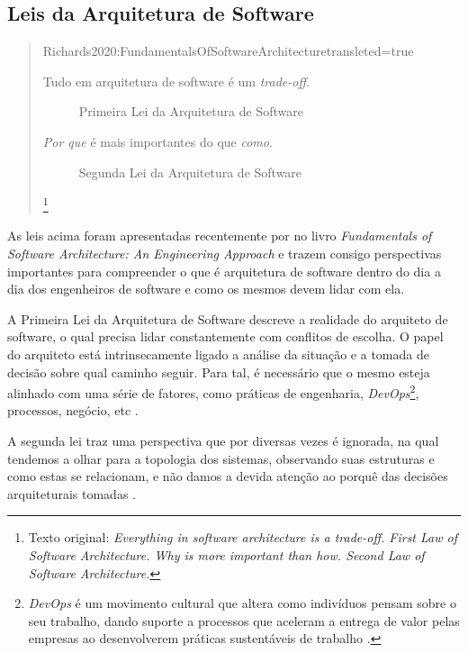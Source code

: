 \subsection{Leis da Arquitetura de Software}
\label{leis}

\begin{quotation}{Richards2020:FundamentalsOfSoftwareArchitecture}{transleted=true}
  \begin{description}
    \item [Tudo em arquitetura de software é um \textit{trade-off}.] Primeira Lei da Arquitetura de
        Software
    \item [\textit{Por que} é mais importantes do que \textit{como}.] Segunda Lei da Arquitetura de Software
  \end{description}\footnote{Texto original: \textit{Everything in software architecture is a trade-off. First Law
    of Software Architecture. Why is more important than how. Second Law of Software Architecture.}}
\end{quotation}

As leis acima foram apresentadas recentemente por 
no livro \textit{Fundamentals of Software Architecture: An Engineering Approach} e trazem consigo
perspectivas importantes para compreender o que é arquitetura de software dentro do dia a dia dos
engenheiros de software e como os mesmos devem lidar com ela.

A Primeira Lei da Arquitetura de Software descreve a realidade do arquiteto de
software, o qual precisa lidar constantemente com conflitos de escolha. O papel do arquiteto está
intrinsecamente ligado a análise da situação e a tomada de decisão sobre qual caminho seguir. Para
tal, é necessário que o mesmo esteja alinhado com uma série de fatores, como práticas de engenharia,
\textit{DevOps}\footnote{\textit{DevOps} é um movimento cultural que altera como indivíduos pensam
sobre o seu trabalho, dando suporte a processos que aceleram a entrega de valor pelas empresas ao
desenvolverem práticas sustentáveis de trabalho \cite{davis2016effective}.}, processos, negócio, etc
\cite{Richards2020:FundamentalsOfSoftwareArchitecture}.

A segunda lei traz uma perspectiva que por diversas vezes é ignorada, na qual tendemos a olhar para
a topologia dos sistemas, observando suas estruturas e como estas se relacionam, e não damos a devida
atenção ao porquê das decisões arquiteturais tomadas \cite{Richards2020:FundamentalsOfSoftwareArchitecture}.

